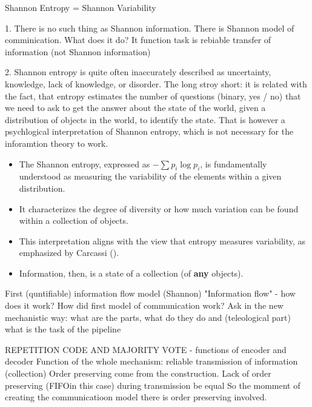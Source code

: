 \documentclass[10pt, aspectratio=169, handout]{beamer}
\begin{document}
\begin{frame}[label=shannon_entropy]{Shannon Entropy =  Shannon Variability}

    1. There is no such thing as Shannon information. There is Shannon model of comminication.
    What does it do? It function task is rebiable transfer of information (not Shannon information)

    2.  Shannon entropy is quite often inaccurately described as uncertainty, knowledge, lack of knowledge, or disorder. The long stroy short: it is related with the fact, that entropy estimates the number of questions (binary, yes / no) that we need to ask to get the answer about the state of the world, given a distribution of objects in the world, to identify the state. That is however a psychlogical interpretation of Shannon entropy, which is not necessary for the inforamtion theory to work.

    \begin{itemize}
        \item The Shannon entropy, expressed as $- \sum p_i \log p_i$, is fundamentally understood as measuring the variability of the elements within a given distribution. 
        \item It characterizes the degree of diversity or how much variation can be found within a collection of objects.
        \item This interpretation aligns with the view that entropy measures variability, as emphasized by Carcassi (\cite{carcassi_variability_2021}).
        \item Information, then, is a state of a collection (of \textbf{any} objects).
    \end{itemize}
\end{frame}









\begin{frame}[label=shannon_flow] {First (quntifiable) information flow model (Shannon)}
    "Information flow" - how does it work?
    How did first model of communication work?
    Ask in the new mechanistic way: what are the parts, what do they do and (teleological part) what is the task of the pipeline

    REPETITION CODE AND MAJORITY VOTE - functions of encoder and decoder 
    Function of the whole mechanism: reliable transmission of information (collection)
    Order preserving come from the construction.
    Lack of order preserving (FIFOin this case) during transmission  be equal 
    So the momment of creating the communicatioon model there is order preserving involved.
     
\end{frame}
\end{document}
